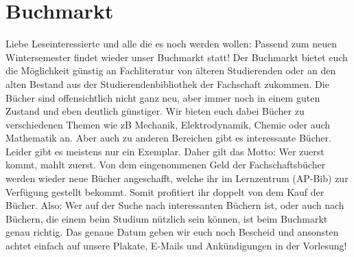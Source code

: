 \vspace{-5ex}
\section{Buchmarkt}
\begin{multicols*}{2}
\begin{wrapfigure}[12]{r}{0cm}
\end{wrapfigure}
Liebe Leseinteressierte und alle die es noch werden wollen: Passend zum neuen Wintersemester findet wieder unser Buchmarkt statt! Der Buchmarkt bietet euch die Möglichkeit günstig an Fachliteratur von älteren Studierenden oder an den alten Bestand aus der Studierendenbibliothek der Fachschaft zukommen. Die Bücher sind offensichtlich nicht ganz neu, aber immer noch in einem guten Zustand und eben deutlich günstiger. 
Wir bieten euch dabei Bücher zu verschiedenen Themen wie zB Mechanik, Elektrodynamik, Chemie oder auch Mathematik an. Aber auch zu anderen Bereichen gibt es interessante Bücher. Leider gibt es meistens nur ein Exemplar. Daher gilt das Motto: Wer zuerst kommt, mahlt zuerst. 
Von dem eingenommenen Geld der Fachschaftsbücher werden wieder neue Bücher angeschafft, welche ihr im Lernzentrum (AP-Bib) zur Verfügung gestellt bekommt. Somit profitiert ihr doppelt von dem Kauf der Bücher. Also: Wer auf der Suche nach interessanten Büchern ist, oder auch nach Büchern, die einem beim Studium nützlich sein können, ist beim Buchmarkt genau richtig.
Das genaue Datum geben wir euch noch Bescheid und ansonsten achtet einfach auf unsere Plakate, E-Mails und Ankündigungen in der Vorlesung!

\end{multicols*}

